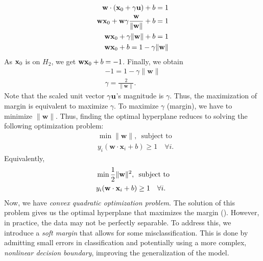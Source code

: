\begin{align*}
	\mathbf{w}\cdot ({\mathbf{x}}_0+\gamma{\mathbf{u}})+b=1\\
	\mathbf{w}{\mathbf{x}}_0+\mathbf{w}\gamma\frac{\mathbf{w}}{\lVert\mathbf{w}\rVert}+b=1\\
	\mathbf{w}{\mathbf{x}}_0+\gamma\lVert \mathbf{w}\rVert +b=1\\
	\mathbf{w}{\mathbf{x}}_0+b=1-\gamma\lVert \mathbf{w}\rVert 
\end{align*}
As ${\mathbf{x}}_0$ is on $H_2$, we get $\mathbf{w}{\mathbf{x}}_0+b=-1$. Finally, we obtain
\begin{align*}
	-1=1-\gamma\lVert \mathbf{w}\rVert \\
	\gamma=\frac{2}{\lVert \mathbf{w}\rVert }.
\end{align*}
Note that the scaled unit vector $\gamma{\mathbf{u}}$'s magnitude is $\gamma$. Thus, the maximization of margin is equivalent to maximize $\gamma$. To maximize $\gamma$ (\ie margin), we have to minimize $\lVert \mathbf{w} \rVert$. Thus, finding the optimal hyperplane reduces to solving the following optimization problem:
\begin{align*}
	&\min \lVert \mathbf{w}\rVert ,\, \textrm{ subject to} \\
	&y_i(\mathbf{w}\cdot \mathbf{x}_i+b)\geq 1 \quad\forall i.
\end{align*}
Equivalently, 
\begin{align*}
	&\min \frac{1}{2}\lVert {\mathbf{w}}\rVert ^2,\, \textrm{ subject to} \\
	&y_i(\mathbf{w}\cdot \mathbf{x}_i+b)\geq 1 \quad\forall i.
\end{align*}
Now, we have \textit{convex quadratic optimization problem}. The solution of this problem gives us the optimal hyperplane that maximizes the margin (\cf {}). However, in practice, the data may not be perfectly separable. To address this, we introduce a \textit{soft margin} that allows for some misclassification. This is done by admitting small errors in classification and potentially using a more complex, \textit{nonlinear decision boundary}, improving the generalization of the model.

